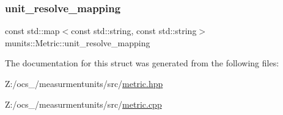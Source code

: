 \mbox{\label{structmunits_1_1_metric_aa44951fa72f8ba14225164eb518ea9ac}} 
\subsubsection{\texorpdfstring{unit\+\_\+resolve\+\_\+mapping}{unit\_resolve\_mapping}}
{\footnotesize\ttfamily const std\+::map$<$const std\+::string, const std\+::string$>$ munits\+::\+Metric\+::unit\+\_\+resolve\+\_\+mapping}



The documentation for this struct was generated from the following files\+:\begin{DoxyCompactItemize}
\item 
Z\+:/ocs\+\_/measurmentunits/src/\hyperlink{metric_8hpp}{metric.\+hpp}\item 
Z\+:/ocs\+\_/measurmentunits/src/\hyperlink{metric_8cpp}{metric.\+cpp}\end{DoxyCompactItemize}
